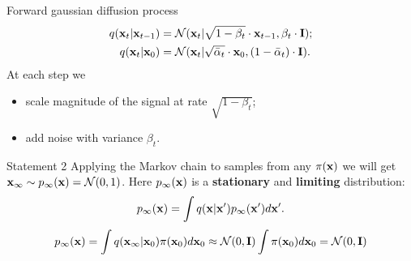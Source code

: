 \begin{frame}{Forward gaussian diffusion process}
	\vspace{-0.5cm}
	\begin{align*}
		q(\mathbf{x}_t | \mathbf{x}_{t-1}) &= \mathcal{N}(\mathbf{x}_t | \sqrt{1 - \beta_t} \cdot \mathbf{x}_{t-1}, \beta_t \cdot \mathbf{I}); \\
		q(\mathbf{x}_t | \mathbf{x}_0) &= \mathcal{N}(\mathbf{x}_t | \sqrt{\bar{\alpha}_t} \cdot \mathbf{x}_0, (1 - \bar{\alpha}_t) \cdot \mathbf{I}).
	\end{align*}
	At each step we
	\begin{itemize}
		\item scale magnitude of the signal at rate $\sqrt{1 - \beta_t}$;
		\item add noise with variance $\beta_t$.
	\end{itemize}
	\begin{block}{Statement 2}
		Applying the Markov chain to samples from any $\pi(\mathbf{x})$ we will get $\mathbf{x}_{\infty} \sim p_{\infty}(\mathbf{x}) = \mathcal{N}(0, 1)$. Here $p_{\infty}(\mathbf{x})$ is a \textbf{stationary} and \textbf{limiting} distribution:
		\vspace{-0.2cm}
		\[
			p_{\infty}(\mathbf{x}) = \int q(\mathbf{x} | \mathbf{x}') p_{\infty}(\mathbf{x}') d \mathbf{x}'. 
		\]
		\[
			p_{\infty}(\mathbf{x}) = \int q(\mathbf{x}_{\infty} | \mathbf{x}_0) \pi(\mathbf{x}_0) d\mathbf{x}_0 \approx \mathcal{N}(0, \mathbf{I}) \int \pi(\mathbf{x}_0) d\mathbf{x}_0 = \mathcal{N}(0, \mathbf{I})
		\]
		\vspace{-0.8cm}
	\end{block}
 \end{frame}

